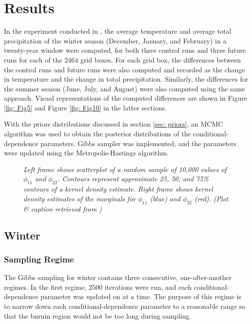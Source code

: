 \documentclass{article}
\begin{document}
\section{Results}
In the experiment conducted in \cite{paper}, the average temperature and average total precipitation of the winter season (December, January, and February) in a twenty-year window were computed, for both three control runs and three future runs for each of the $2464$ grid boxes. For each grid box, the differences between the control runs and future runs were also computed and recorded as the change in temperature and the change in total precipitation. Similarly, the differences for the summer season (June, July, and August) were also computed using the same approach. Visual representations of the computed differences are shown in Figure \ref{fig: Fig5} and Figure \ref{fig: Fig10} in the latter sections.

With the priors distributions discussed in section \ref{sec: priors}, an MCMC algorithm was used to obtain the posterior distributions of the conditional-dependence parameters. Gibbs sampler was implemented, and the parameters were updated using the Metropolis-Hastings algorithm. 

\begin{figure}
  \centering
  \caption{\small \emph{Left frame shows scatterplot of a random sample of 10,000 values of $\phi_{11}$ and $\phi_{22}$. Contours represent approximate 25, 50, and 75\% contours of a kernel density estimate. Right frame shows kernel density estimates of the marginals for $\phi_{11}$ (blue) and $\phi_{22}$ (red). (Plot \& caption retrieved from \cite{paper})}}
  \label{fig: Fig3}
\end{figure}

\subsection{Winter}
\subsubsection{Sampling Regime}
\label{sec: regimes}
The Gibbs sampling for winter contains three consecutive, one-after-another regimes. In the first regime, 2500 iterations were run, and each conditional-dependence parameter was updated on at a time. The purpose of this regime is to narrow down each conditional-dependence parameter to a reasonable range so that the burnin region would not be too long during sampling. 
\end{document}
